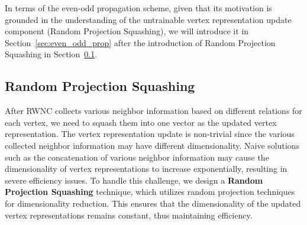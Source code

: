 \documentclass[lettersize,journal]{IEEEtran}
\begin{document}
In terms of the even-odd propagation scheme, given that its motivation is grounded in the understanding of the untrainable vertex representation update component (Random Projection Squashing), we will introduce it in Section~\ref{sec:even_odd_prop} after the introduction of Random Projection Squashing in Section~\ref{sec:rand_proj_squash}.












\subsection{Random Projection Squashing}\label{sec:rand_proj_squash} 

After RWNC collects various neighbor information based on different relations for each vertex, we need to squash them into one vector as the updated vertex representation.
The vertex representation update is non-trivial since the various collected neighbor information may have different dimensionality.
Naive solutions such as the concatenation of various neighbor information may cause the dimensionality of vertex representations to increase exponentially, resulting in severe efficiency issues.
To handle this challenge, we design a \textbf{Random Projection Squashing} technique, which utilizes random projection techniques for dimensionality reduction. 
This ensures that the dimensionality of the updated vertex representations remains constant, thus maintaining efficiency.
\end{document}
